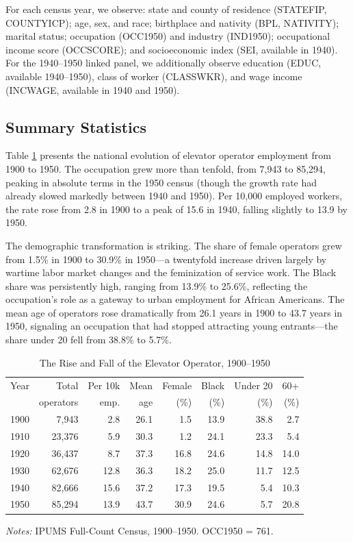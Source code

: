 \documentclass[12pt]{article}
\begin{document}
For each census year, we observe: state and county of residence (STATEFIP, COUNTYICP); age, sex, and race; birthplace and nativity (BPL, NATIVITY); marital status; occupation (OCC1950) and industry (IND1950); occupational income score (OCCSCORE); and socioeconomic index (SEI, available in 1940). For the 1940--1950 linked panel, we additionally observe education (EDUC, available 1940--1950), class of worker (CLASSWKR), and wage income (INCWAGE, available in 1940 and 1950).

\subsection{Summary Statistics}

Table \ref{tab:national_summary} presents the national evolution of elevator operator employment from 1900 to 1950. The occupation grew more than tenfold, from 7,943 to 85,294, peaking in absolute terms in the 1950 census (though the growth rate had already slowed markedly between 1940 and 1950). Per 10,000 employed workers, the rate rose from 2.8 in 1900 to a peak of 15.6 in 1940, falling slightly to 13.9 by 1950.

The demographic transformation is striking. The share of female operators grew from 1.5\% in 1900 to 30.9\% in 1950---a twentyfold increase driven largely by wartime labor market changes and the feminization of service work. The Black share was persistently high, ranging from 13.9\% to 25.6\%, reflecting the occupation's role as a gateway to urban employment for African Americans. The mean age of operators rose dramatically from 26.1 years in 1900 to 43.7 years in 1950, signaling an occupation that had stopped attracting young entrants---the share under 20 fell from 38.8\% to 5.7\%.

\begin{table}[H]
\centering
\caption{The Rise and Fall of the Elevator Operator, 1900--1950}
\label{tab:national_summary}
\small
\begin{tabular}{lrrrrrrr}
\toprule
Year & Total & Per 10k & Mean & Female & Black & Under 20 & 60+ \\
 & operators & emp. & age & (\%) & (\%) & (\%) & (\%) \\
\midrule
1900 & 7,943 & 2.8 & 26.1 & 1.5 & 13.9 & 38.8 & 2.7 \\
1910 & 23,376 & 5.9 & 30.3 & 1.2 & 24.1 & 23.3 & 5.4 \\
1920 & 36,437 & 8.7 & 37.3 & 16.8 & 24.6 & 14.8 & 14.0 \\
1930 & 62,676 & 12.8 & 36.3 & 18.2 & 25.0 & 11.7 & 12.5 \\
1940 & 82,666 & 15.6 & 37.2 & 17.3 & 19.5 & 5.4 & 10.3 \\
1950 & 85,294 & 13.9 & 43.7 & 30.9 & 24.6 & 5.7 & 20.8 \\
\bottomrule
\end{tabular}

\vspace{0.5em}
\footnotesize\noindent\textit{Notes:} IPUMS Full-Count Census, 1900--1950. OCC1950 = 761.
\normalsize
\end{table}
\end{document}
